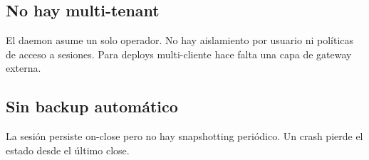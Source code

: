 \subsection*{No hay multi-tenant}

El daemon asume un solo operador. No hay aislamiento por usuario
ni políticas de acceso a sesiones. Para deploys multi-cliente
hace falta una capa de gateway externa.

\subsection*{Sin backup automático}

La sesión persiste on-close pero no hay snapshotting periódico. Un
crash pierde el estado desde el último close.
